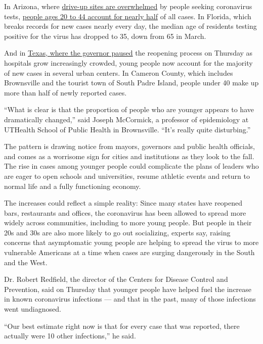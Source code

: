 In Arizona, where
\href{https://www.nytimes.com/2020/06/25/upshot/virus-testing-shortfall-arizona.html}{drive-up
sites are overwhelmed} by people seeking coronavirus tests,
\href{https://www.azdhs.gov/preparedness/epidemiology-disease-control/infectious-disease-epidemiology/covid-19/dashboards/index.php}{people
ages 20 to 44 account for nearly half} of all cases. In Florida, which
breaks records for new cases nearly every day, the median age of
residents testing positive for the virus has dropped to 35, down from 65
in March.

And in
\href{https://www.nytimes.com/2020/06/25/us/texas-coronavirus-cases-reopening.html}{Texas,
where the governor paused} the reopening process on Thursday as
hospitals grow increasingly crowded, young people now account for the
majority of new cases in several urban centers. In Cameron County, which
includes Brownsville and the tourist town of South Padre Island, people
under 40 make up more than half of newly reported cases.

``What is clear is that the proportion of people who are younger appears
to have dramatically changed,'' said Joseph McCormick, a professor of
epidemiology at UTHealth School of Public Health in Brownsville. ``It's
really quite disturbing.''

The pattern is drawing notice from mayors, governors and public health
officials, and comes as a worrisome sign for cities and institutions as
they look to the fall. The rise in cases among younger people could
complicate the plans of leaders who are eager to open schools and
universities, resume athletic events and return to normal life and a
fully functioning economy.

The increases could reflect a simple reality: Since many states have
reopened bars, restaurants and offices, the coronavirus has been allowed
to spread more widely across communities, including to more young
people. But people in their 20s and 30s are also more likely to go out
socializing, experts say, raising concerns that asymptomatic young
people are helping to spread the virus to more vulnerable Americans at a
time when cases are surging dangerously in the South and the West.

Dr. Robert Redfield, the director of the Centers for Disease Control and
Prevention, said on Thursday that younger people have helped fuel the
increase in known coronavirus infections --- and that in the past, many
of those infections went undiagnosed.

``Our best estimate right now is that for every case that was reported,
there actually were 10 other infections,'' he said.


